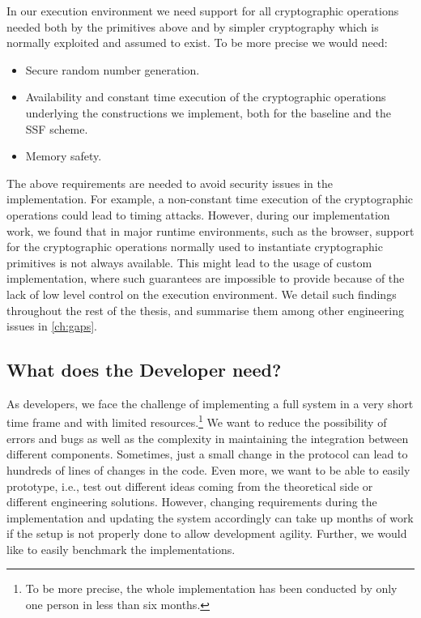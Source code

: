 In our execution environment 
we need support for all cryptographic operations
needed both by the primitives above and by simpler
cryptography which is normally exploited and assumed to exist. 
To be more precise we would need:
\begin{itemize}
    \item Secure random number generation.
    \item Availability and constant time execution of the cryptographic operations underlying the constructions we implement, both for the baseline and the SSF scheme.
    \item Memory safety.
\end{itemize}
The above requirements are needed to avoid security
issues in the implementation. For example, a non-constant
time execution of the cryptographic operations could
lead to timing attacks. 
However, during our implementation work, 
we found that in major runtime
environments, such as the browser, 
support for the cryptographic operations normally
used to instantiate cryptographic primitives is not always available.
This might lead to the usage of custom implementation,
where such guarantees are impossible to provide because
of the lack of low level control on the execution environment.
We detail such findings throughout the rest of the thesis,
and summarise them among other engineering issues in \cref{ch:gaps}.

\subsection{What does the Developer need?}\label{sc:developer}

As developers, we face the challenge of implementing a full
system in a very short time frame and with limited resources.\footnote{To be more precise, the whole implementation has been conducted by only one person in less than six months.}
We want to reduce the possibility of errors and bugs
as well as the complexity in maintaining the integration between
different components.
Sometimes, just a small change in the protocol can lead to
hundreds of lines of changes in the code.
Even more, we want to be able to easily prototype, i.e., 
test out different ideas coming from the theoretical side
or different engineering solutions.
However, changing requirements during the implementation
and updating the system accordingly can take up months of work
if the setup is not properly done to allow development agility.
Further, we would like to easily benchmark the implementations.



